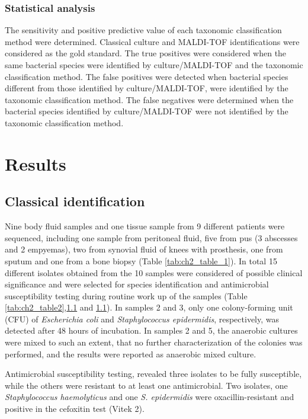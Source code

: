 \subsubsection{Statistical analysis}

The sensitivity and positive predictive value of each taxonomic classification method were determined. 
Classical culture and MALDI-TOF identifications were considered as the gold standard. 
The true positives were considered when the same bacterial species were identified by culture/MALDI-TOF and the taxonomic classification method. 
The false positives were detected when bacterial species different from those identified by culture/MALDI-TOF, were identified by the taxonomic classification method. 
The false negatives were determined when the bacterial species identified by culture/MALDI-TOF were not identified by the taxonomic classification method.

\section{Results} \label{sec:ch2_results}

\subsection{Classical identification}

Nine body fluid samples and one tissue sample from 9 different patients were sequenced, including one sample from peritoneal fluid, five from pus (3 abscesses and 2 empyemas), two from synovial fluid of knees with prosthesis, one from sputum and one from a bone biopsy (Table \ref{tab:ch2_table_1}).
In total 15 different isolates obtained from the 10 samples were considered of possible clinical significance and were selected for species identification and antimicrobial susceptibility testing during routine work up of the samples (Table \ref{tab:ch2_table2},\ref{} and \ref{}).
In samples 2 and 3, only one colony-forming unit (CFU) of \textit{Escherichia coli} and \textit{Staphylococcus epidermidis}, respectively, was detected after 48 hours of incubation. 
In samples 2 and 5, the anaerobic cultures were mixed to such an extent, that no further characterization of the colonies was performed, and the results were reported as anaerobic mixed culture.

Antimicrobial susceptibility testing, revealed three isolates to be fully susceptible, while the others were resistant to at least one antimicrobial. 
Two isolates, one \textit{Staphylococcus haemolyticus} and one \textit{S. epidermidis} were oxacillin-resistant and positive in the cefoxitin test (Vitek 2).

